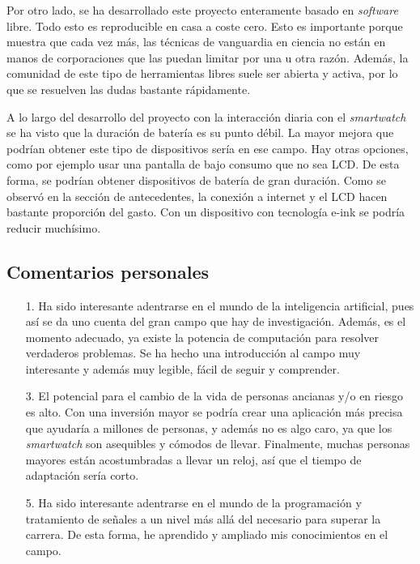 \documentclass[12pt]{book}
\numberwithin{equation}{section}
\begin{document}
Por otro lado, se ha desarrollado este proyecto enteramente basado en \textit{software} libre. Todo esto es reproducible en casa a coste cero. Esto es importante porque muestra que cada vez más, las técnicas de vanguardia en ciencia no están en manos de corporaciones que las puedan limitar por una u otra razón. Además, la comunidad de este tipo de herramientas libres suele ser abierta y activa, por lo que se resuelven las dudas bastante rápidamente.

A lo largo del desarrollo del proyecto con la interacción diaria con el \textit{smartwatch} se ha visto que la duración de batería es su punto débil. La mayor mejora que podrían obtener este tipo de dispositivos sería en ese campo. Hay otras opciones, como por ejemplo usar una pantalla de bajo consumo que no sea LCD. De esta forma, se podrían obtener dispositivos de batería de gran duración. Como se observó en la sección de antecedentes, la conexión a internet y el LCD hacen bastante proporción del gasto. Con un dispositivo con tecnología e-ink se podría reducir muchísimo.

\subsection{Comentarios personales}

\begin{enumerate}
\item[1.] Ha sido interesante adentrarse en el mundo de la inteligencia artificial, pues así se da uno cuenta del gran campo que hay de investigación. Además, es el momento adecuado, ya existe la potencia de computación para resolver verdaderos problemas. Se ha hecho una introducción al campo muy interesante y además muy legible, fácil de seguir y comprender.

\item[3.] El potencial para el cambio de la vida de personas ancianas y/o en riesgo es alto. Con una inversión mayor se podría crear una aplicación más precisa que ayudaría a millones de personas, y además no es algo caro, ya que los \textit{smartwatch} son asequibles y cómodos de llevar. Finalmente, muchas personas mayores están acostumbradas a llevar un reloj, así que el tiempo de adaptación sería corto.

\item[5.] Ha sido interesante adentrarse en el mundo de la programación y tratamiento de señales a un nivel más allá del necesario para superar la carrera. De esta forma, he aprendido y ampliado mis conocimientos en el campo.
\end{enumerate}
\end{document}
